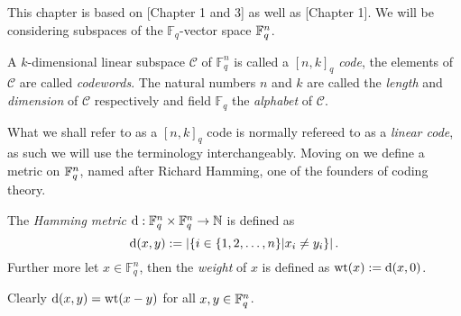 This chapter is based on \cite{huffman}[Chapter 1 and 3] as well as \cite{alg_geom_codes}[Chapter 1]. We will be considering subspaces of the $\mathbb{F}_q$-vector space $\mathbb{F}_{q}^{n}$.

\begin{definition}
  A $k$-dimensional linear subspace $\mathcal{C}$ of $\mathbb{F}_{q}^{n}$ is called a $[n, k]_q$ \textit{code}, the elements of $\mathcal{C}$ are called \textit{codewords}.
  The natural numbers $n$ and $k$ are called the \textit{length} and \textit{dimension}
  of $\mathcal{C}$ respectively and field $\mathbb{F}_{q}$ the \textit{alphabet} of $\mathcal{C}$.
\end{definition}

What we shall refer to as a $[n, k]_{q}$ code is normally refereed to as a \textit{linear code}, as such we will use the terminology interchangeably.
Moving on we define a metric on $\mathbb{F}_{q}^{n}$, named after Richard Hamming, one of the founders of coding theory.
\begin{definition}
 The \textit{Hamming metric} $\mathrm{d}: \mathbb{F}_{q}^{n} \times \mathbb{F}_{q}^{n} \to \mathbb{N}$ is defined as
  \begin{equation*}
    \mathrm{d}(x, y) := \left\lvert\left\{i \in \{1,2, \ldots, n\}  \middle| x_i \neq y_{i}\right\}\right\rvert.
  \end{equation*}
  Further more let $x \in \mathbb{F}_q^{n}$, then the \textit{weight} of $x$ is defined as $\mathrm{wt}(x) := \mathrm{d}(x, 0)$.
\end{definition}
\begin{remark}
  Clearly $\mathrm{d}(x, y) = \mathrm{wt}(x - y)$ for all $x, y \in \mathbb{F}_{q}^{n}$.
\end{remark}

